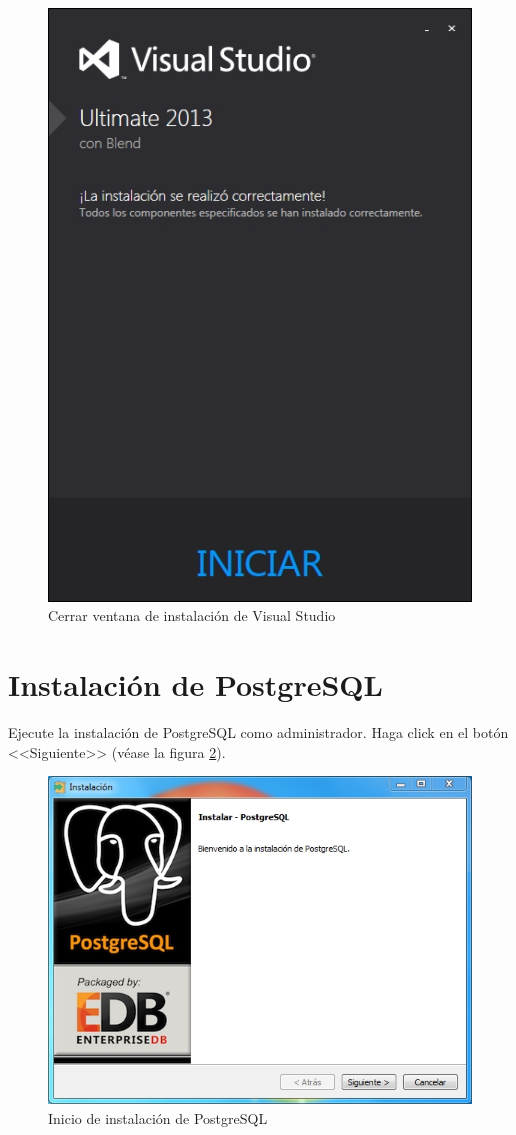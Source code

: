 \begin{figure}[H]
  \centering
  \includegraphics[width=.8\linewidth]{./img/vs-instalacion4.jpg}
\caption[Cerrar ventana de instalaci\'{o}n de Visual Studio]{Cerrar ventana de instalaci\'{o}n de Visual Studio\label{fig:vs-instalacion4}}
\end{figure}

\newpage

\section{Instalaci\'{o}n de PostgreSQL}
	
Ejecute la instalaci\'{o}n de PostgreSQL como administrador. Haga click en el bot\'{o}n <<Siguiente>> (v\'{e}ase la figura \ref{fig:postgres1}).

\begin{figure}[H]
  \centering
  \includegraphics[width=.6\linewidth]{./img/postgres1.jpg}
\caption[Inicio de instalaci\'{o}n de PostgreSQL]{Inicio de instalaci\'{o}n de PostgreSQL\label{fig:postgres1}}
\end{figure}

